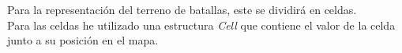 Para la representación del terreno de batallas, este se dividirá en celdas. \\
Para las celdas he utilizado una estructura \textit{Cell} que contiene el valor de la celda junto a su posición en el mapa.